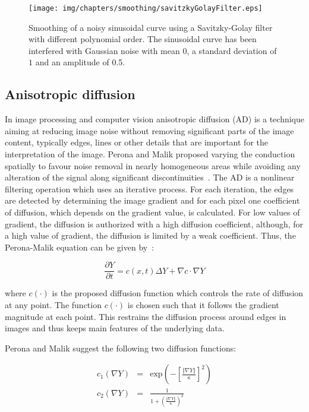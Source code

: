 \begin{figure}[htb]
   \centering   
   \texttt{[image: img/chapters/smoothing/savitzkyGolayFilter.eps]}
   \caption[Savitzky$-$Golay filter smoothing]{Smoothing of a noisy sinusoidal curve using a Savitzky-Golay filter with different polynomial order. The sinusoidal curve has been interfered with Gaussian noise with mean $0$, a standard deviation of $1$ and an amplitude of 0.5.}
   \label{fig:savitzkyGolayFilter}
\end{figure} 

\subsection{Anisotropic diffusion}\label{subsec:anisotropicDiffusion}
In image processing and computer vision anisotropic diffusion (AD) is a technique aiming at reducing image noise without removing significant parts of the image content, typically edges, lines or other details that are important for the interpretation of the image. Perona and Malik proposed varying the conduction spatially to favour noise removal in nearly homogeneous areas while avoiding any alteration of the signal along significant discontinuities~\cite{Perona1990}. The AD is a nonlinear filtering operation which uses an iterative process. For each iteration, the edges are detected by determining the image gradient and for each pixel one coefficient of diffusion, which depends on the gradient value, is calculated. For low values of gradient, the diffusion is authorized with a high diffusion coefficient, although, for a high value of gradient, the diffusion is limited by a weak coefficient. Thus, the Perona-Malik equation can be given by~\cite{Perona1990}:

\begin{equation}
	\frac{\partial Y}{\partial t} = c(x,t)\Delta Y + \nabla c \cdot \nabla Y
	\label{eqn:peronaMalikEquation}
\end{equation} 

where $c(\cdot)$ is the proposed diffusion function which controls the rate of diffusion at any point. The function $c(\cdot)$ is chosen such that it follows the gradient magnitude at each point. This restrains the diffusion process around edges in images and thus keeps main features of the underlying data.

Perona and Malik suggest the following two diffusion functions:

\begin{eqnarray}
	c_{1}(\nabla Y) &=& \text{exp}\left(-\left[\frac{\Vert \nabla Y \Vert}{\kappa}\right]^{2}\right) \label{eqn:fluxFunction1}\\
	c_{2}(\nabla Y) &=& \frac{1}{1+\left(\frac{\Vert \nabla Y \Vert}{\kappa}\right)^{2}} \label{eqn:fluxFunction2}
\end{eqnarray}

